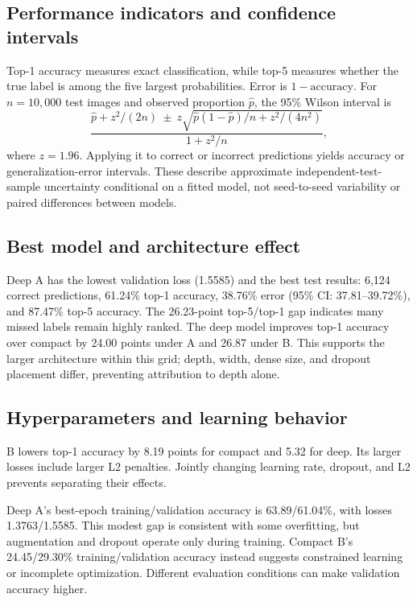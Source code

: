 \documentclass[conference]{IEEEtran}
\begin{document}
\subsection{Performance indicators and confidence intervals}
Top-1 accuracy measures exact classification, while top-5 measures whether the true label is among the five largest probabilities. Error is $1-\text{accuracy}$. For $n=10,000$ test images and observed proportion $\hat p$, the 95\% Wilson interval is
\begin{equation}
\frac{\hat p+z^2/(2n)\ \pm\ z\sqrt{\hat p(1-\hat p)/n+z^2/(4n^2)}}{1+z^2/n},
\end{equation}
where $z=1.96$. Applying it to correct or incorrect predictions yields accuracy or generalization-error intervals. These describe approximate independent-test-sample uncertainty conditional on a fitted model, not seed-to-seed variability or paired differences between models.

\subsection{Best model and architecture effect}
Deep A has the lowest validation loss (1.5585) and the best test results: 6,124 correct predictions, 61.24\% top-1 accuracy, 38.76\% error (95\% CI: 37.81--39.72\%), and 87.47\% top-5 accuracy. The 26.23-point top-5/top-1 gap indicates many missed labels remain highly ranked. The deep model improves top-1 accuracy over compact by 24.00 points under A and 26.87 under B. This supports the larger architecture within this grid; depth, width, dense size, and dropout placement differ, preventing attribution to depth alone.

\subsection{Hyperparameters and learning behavior}
B lowers top-1 accuracy by 8.19 points for compact and 5.32 for deep. Its larger losses include larger L2 penalties. Jointly changing learning rate, dropout, and L2 prevents separating their effects.

Deep A's best-epoch training/validation accuracy is 63.89/61.04\%, with losses 1.3763/1.5585. This modest gap is consistent with some overfitting, but augmentation and dropout operate only during training. Compact B's 24.45/29.30\% training/validation accuracy instead suggests constrained learning or incomplete optimization. Different evaluation conditions can make validation accuracy higher.
\end{document}

